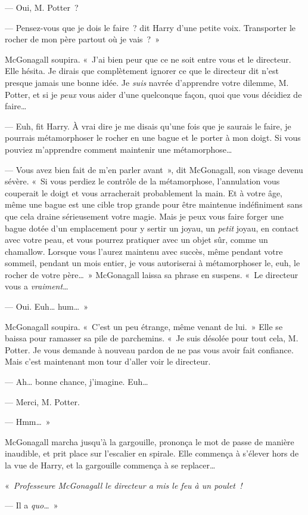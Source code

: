 --- Oui, M. Potter~?

--- Pensez-vous que je dois le faire~? dit Harry d'une petite voix.
Transporter le rocher de mon père partout où je vais~?~»

McGonagall soupira.
«~J'ai bien peur que ce ne soit entre vous et le directeur.
Elle hésita.
Je dirais que complètement ignorer ce que le directeur dit n'est presque jamais une bonne idée.
Je \emph{suis} navrée d'apprendre votre dilemme, M. Potter, et si je \emph{peux} vous aider d'une quelconque façon, quoi que vous décidiez de faire…

--- Euh, fit Harry.
À vrai dire je me disais qu'une fois que je saurais le faire, je pourrais métamorphoser le rocher en une bague et le porter à mon doigt.
Si vous pouviez m'apprendre comment maintenir une métamorphose…

--- Vous avez bien fait de m'en parler avant~», dit McGonagall, son visage devenu sévère.
«~Si vous perdiez le contrôle de la métamorphose, l'annulation vous couperait le doigt et vous arracherait probablement la main.
Et à votre âge, même une bague est une cible trop grande pour être maintenue indéfiniment sans que cela draine sérieusement votre magie.
Mais je peux vous faire forger une bague dotée d'un emplacement pour y sertir un joyau, un \emph{petit} joyau, en contact avec votre peau, et vous pourrez pratiquer avec un objet sûr, comme un chamallow.
Lorsque vous l'aurez maintenu avec succès, même pendant votre sommeil, pendant un mois entier, je vous autoriserai à métamorphoser le, euh, le rocher de votre père…~»
McGonagall laissa sa phrase en suspens.
«~Le directeur vous a \emph{vraiment}…

--- Oui. Euh… hum…~»

McGonagall soupira.
«~C'est un peu étrange, même venant de lui.~»
Elle se baissa pour ramasser sa pile de parchemins.
«~Je suis désolée pour tout cela, M. Potter.
Je vous demande à nouveau pardon de ne pas vous avoir fait confiance.
Mais c'est maintenant mon tour d'aller voir le directeur.

--- Ah… bonne chance, j'imagine. Euh…

--- Merci, M. Potter.

--- Hmm…~»

McGonagall marcha jusqu'à la gargouille, prononça le mot de passe de manière inaudible, et prit place sur l'escalier en spirale.
Elle commença à s'élever hors de la vue de Harry, et la gargouille commença à se replacer…

«~\emph{Professeure McGonagall le directeur a mis le feu à un poulet~!}

--- Il a \emph{quo…}~»
